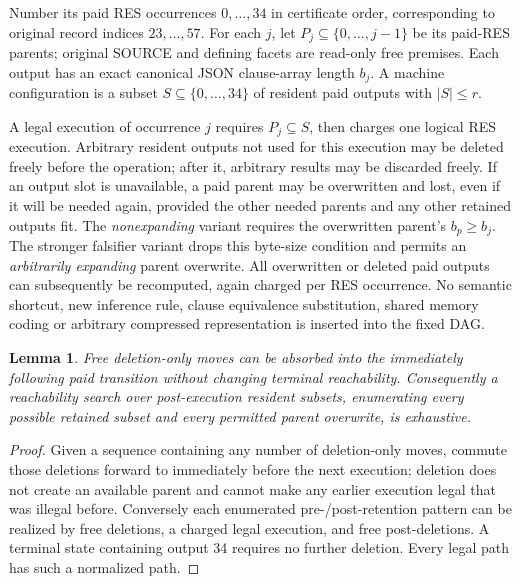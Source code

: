 \documentclass[11pt]{article}
\newtheorem{lemma}{Lemma}
\begin{document}
Number its paid RES occurrences \(0,\ldots,34\) in certificate order, corresponding to original record indices \(23,\ldots,57\). For each \(j\), let \(P_j\subseteq\{0,\ldots,j-1\}\) be its paid-RES parents; original SOURCE and defining facets are read-only free premises. Each output has an exact canonical JSON clause-array length \(b_j\). A machine configuration is a subset \(S\subseteq\{0,\ldots,34\}\) of resident paid outputs with \(|S|\leq r\).

A legal execution of occurrence \(j\) requires \(P_j\subseteq S\), then charges one logical RES execution. Arbitrary resident outputs not used for this execution may be deleted freely before the operation; after it, arbitrary results may be discarded freely. If an output slot is unavailable, a paid parent may be overwritten and lost, even if it will be needed again, provided the other needed parents and any other retained outputs fit. The \emph{nonexpanding} variant requires the overwritten parent's \(b_p\ge b_j\). The stronger falsifier variant drops this byte-size condition and permits an \emph{arbitrarily expanding} parent overwrite. All overwritten or deleted paid outputs can subsequently be recomputed, again charged per RES occurrence. No semantic shortcut, new inference rule, clause equivalence substitution, shared memory coding or arbitrary compressed representation is inserted into the fixed DAG.

\begin{lemma}
Free deletion-only moves can be absorbed into the immediately following paid transition without changing terminal reachability. Consequently a reachability search over post-execution resident subsets, enumerating every possible retained subset and every permitted parent overwrite, is exhaustive.
\end{lemma}
\begin{proof}
Given a sequence containing any number of deletion-only moves, commute those deletions forward to immediately before the next execution; deletion does not create an available parent and cannot make any earlier execution legal that was illegal before. Conversely each enumerated pre-/post-retention pattern can be realized by free deletions, a charged legal execution, and free post-deletions. A terminal state containing output 34 requires no further deletion. Every legal path has such a normalized path.
\end{proof}
\end{document}
